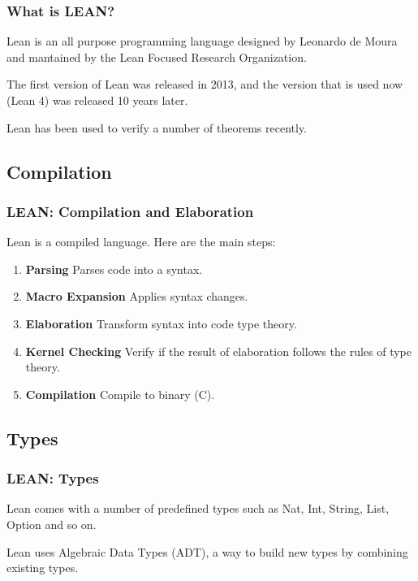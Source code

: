 \documentclass{beamer}
\begin{document}
\begin{frame}
  \frametitle{What is LEAN?}

  Lean is an all purpose programming language designed by Leonardo de Moura and mantained by the Lean Focused Research Organization.

  \vspace{5mm}

  The first version of Lean was released in 2013, and the version that is used now (Lean 4) was released 10 years later.

  \vspace{5mm}

  Lean has been used to verify a number of theorems recently.

\end{frame}

\subsection{Compilation}

\begin{frame}
  \frametitle{LEAN: Compilation and Elaboration}

  Lean is a compiled language. Here are the main steps:

  \begin{enumerate}
    \item \textbf{Parsing} Parses code into a syntax.
    \item \textbf{Macro Expansion} Applies syntax changes.
    \item \textbf{Elaboration} Transform syntax into code type theory.
    \item \textbf{Kernel Checking} Verify if the result of elaboration follows the rules of type theory.
    \item \textbf{Compilation} Compile to binary (C).
  \end{enumerate}
\end{frame}

\subsection{Types}

\begin{frame}
  \frametitle{LEAN: Types}

  Lean comes with a number of predefined types such as Nat, Int, String, List, Option and so on.

  \vspace{1cm}

  Lean uses Algebraic Data Types (ADT), a way to build new types by combining existing types.
\end{frame}
\end{document}
